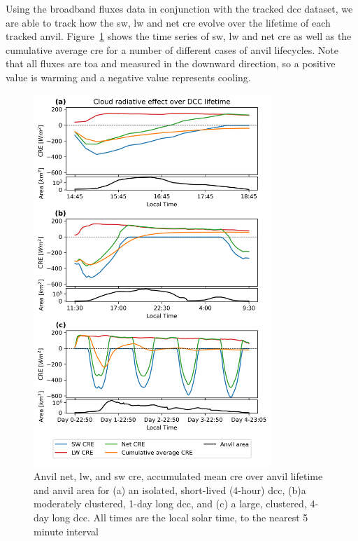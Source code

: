 Using the broadband fluxes data in conjunction with the tracked \acrshort{dcc}
dataset, we are able to track how the \acrshort{sw}, \acrshort{lw} and net \acrshort{cre} evolve over the
lifetime of each tracked anvil. Figure~\ref{fig:cre_lifecycle_examples} shows the time series of \acrshort{sw}, \acrshort{lw}
and net \acrshort{cre} as well as the cumulative average \acrshort{cre} for a number of
different cases of anvil lifecycles. Note that all fluxes are
\acrshort{toa} and measured in the downward direction, so a positive
value is warming and a negative value represents cooling.


\begin{figure}[tp]
    \centering
    \includegraphics[width=0.8\textwidth]{figures/ch3_10.png}
    \caption[
    Anvil net, \acrshort{lw}, and \acrshort{sw} \acrshort{cre}, accumulated mean \acrshort{cre} over anvil lifetime
    ]{
    Anvil net, \acrshort{lw}, and \acrshort{sw} \acrshort{cre}, accumulated mean \acrshort{cre} over anvil lifetime and anvil area for (a) an isolated, short-lived (4-hour) \acrshort{dcc}, (b)a moderately clustered, 1-day long \acrshort{dcc}, and (c) a large, clustered, 4-day long \acrshort{dcc}. All times are the local solar time, to the nearest 5 minute interval
    }
    \label{fig:cre_lifecycle_examples}
\end{figure}


